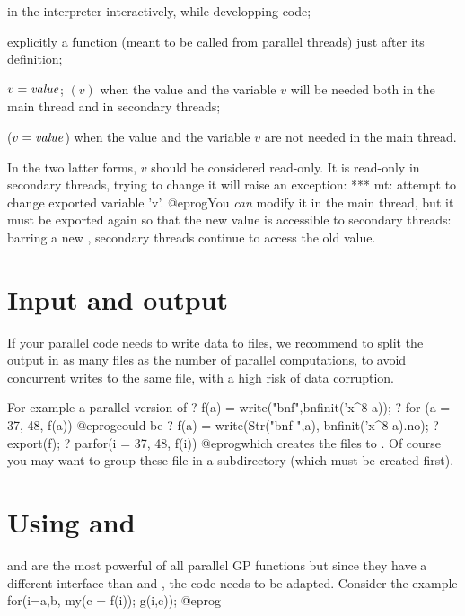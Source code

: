 \item {} in the  interpreter interactively, while
  developping code;

\item {} explicitly a function (meant to be called from parallel
  threads) just after its definition;

\item $v = \hbox{\it value\/}$; $(v)$ when the value and the variable $v$
  will be needed both in the main thread and in secondary threads;

\item {}($v = \hbox{\it value\/}$) when the value and the variable $v$
  are not needed in the main thread.

In the two latter forms, $v$ should be considered read-only. It is
read-only in secondary threads, trying to change it will raise an exception:
\bprog
  ***   mt: attempt to change exported variable 'v'.
@eprog\noindent You \emph{can} modify it in the main thread, but it must be
exported again so that the new value is accessible to secondary threads:
barring a new , secondary threads continue to access the old value.

\section{Input and output} If your parallel code needs to write data to
files, we recommend to split the output in as many files as the number of
parallel computations, to avoid concurrent writes to the same file, with a
high risk of data corruption.

For example a parallel version of
\bprog
? f(a) = write("bnf",bnfinit('x^8-a));
? for (a = 37, 48, f(a))
@eprog\noindent could be
\bprog
? f(a) = write(Str("bnf-",a), bnfinit('x^8-a).no);
? export(f);
? parfor(i = 37, 48, f(i))
@eprog\noindent which creates the files  to . Of
course you may want to group these file in a subdirectory (which must be
created first).

\section{Using  and }
 and  are the most powerful of all parallel GP
functions but since they have a different interface than  and
, the code needs to be adapted. Consider the example
\bprog
for(i=a,b,
  my(c = f(i));
  g(i,c));
@eprog\noindent

